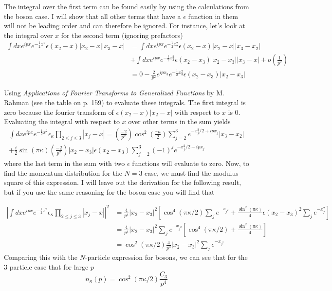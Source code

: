 \documentclass[onecolumn,english,aps,pra]{revtex4}
\begin{document}
%
The integral over the first term can be found easily by using the calculations from the boson case. I will show that all other terms that have a $\epsilon$ function in them will not be leading order and can therefore be ignored. For instance, let's look at the integral over $x$ for the second term (ignoring prefactors)
%
\begin{align*}
\int dx e^{i p x} e^{-\frac{1}{2} x^2} \epsilon(x_{2} - x) |x_{2} - x| |x_{3} - x|
&= \int dx e^{i p x} e^{-\frac{1}{2} x_{2}^2} \epsilon(x_{2} - x) |x_{2} - x| |x_{3} - x_{2}| \\
& + \int dx e^{i p x} e^{-\frac{1}{2} x_{3}^2} \epsilon(x_{2} -x_{3}) |x_{2} - x_{3}| |x_{3} - x| + o (\frac{1}{p^2})\\
&= 0 - \frac{2}{p^2} e^{ipx_{3}}e^{-\frac{1}{2} x_{3}^2} \epsilon(x_{2} -x_{3}) |x_{2} - x_{3}| 
\end{align*}

Using \textit{Applications of Fourier Transforms to Generalized Functions} by M. Rahman (see the table on p. 159) to evaluate these integrals. The first integral is zero because the fourier transform of $\epsilon(x_{2} - x) |x_{2} - x|$ with respect to $x$ is 0. Evaluating the integral with respect to $x$ over other terms in the sum yields
\begin{align*}
\int dx e^{i p x} e^{-\frac{1}{2} x^2} \epsilon_{\kappa} \prod_{2 \leq j \leq 3} |x_{j} - x| = \left( \frac{-2}{p^2} \right) 
 \cos^2(\frac{\pi \kappa}{2}) \sum_{j=2}^{3} e^{-x_{j}^2/2 + ipx_{j}} |x_{3} - x_{2}|\\
 + \frac{i}{2} \sin(\pi \kappa) \left( \frac{-2}{p^2} \right) |x_{2} - x_{3}| \epsilon(x_{2} - x_{3})
 \sum_{j=2}^{3} (-1)^{j} e^{-x_{j}^{2}/2 + ipx_{j}} 
\end{align*}
where the last term in the sum with two $\epsilon$ functions will evaluate to zero. Now, to find the momentum distribution for the $N = 3$ case, we must find the modulus square of this expression. I will leave out the derivation for the following result, but if you use the same reasoning for the boson case you will find that 

\begin{align*}
\left| \int dx e^{i p x} e^{-\frac{1}{2} x^2} \epsilon_{\kappa} \prod_{2 \leq j \leq 3} |x_{j} - x| \right|^2 & = 
\frac{4}{p^4} |x_{2}-x_{3}|^2 \left[ \cos^4(\pi \kappa /2) \sum_{j} e^{-x_{j^2}} + \frac{\sin^2(\pi \kappa)}{4} \epsilon(x_{2} - x_{3})^2 \sum_{j} e^{-x_{j}^2} \right]\\
& = \frac{4}{p^4} |x_{2}-x_{3}|^2 \sum_{j} e^{-x_{j^2}} \left[ \cos^4(\pi \kappa /2) + \frac{\sin^2(\pi \kappa)}{4} \right]\\
& = \cos^2(\pi \kappa /2)\frac{4}{p^4} |x_{2}-x_{3}|^2 \sum_{j} e^{-x_{j^2}}
\end{align*}
Comparing this with the $N$-particle expression for bosons, we can see that for the $3$ particle case that for large $p$
\[
n_{\kappa}(p) = \cos^2(\pi \kappa /2) \frac{C_{3}}{p^4}
\]
\end{document}
